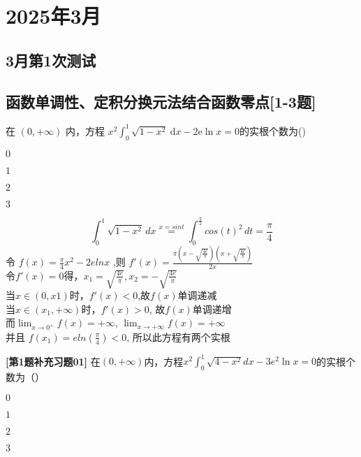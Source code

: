\chapter{2025年3月}
\section{3月第1次测试}
\section*{函数单调性、定积分换元法结合函数零点[1-3题]}
\begin{question}
    在  $(0,+\infty)$  内，方程  $x^{2} \int_{0}^{1} \sqrt{1-x^{2}} \mathrm{~d} x-2 \mathrm{e} \ln x=0$的实根个数为(\qquad)
  
    \begin{choices}
      \item $0$
      \item $1$
      \item $2$
      \item $3$
    \end{choices}
  \end{question}
\begin{solution}
    \[\int_{0}^{1} \sqrt{1-x^2} \,dx \stackrel{x = sint}{=} \int_{0}^{\frac{\pi}{2}} {cos(t)}^2 \,dt = \frac{\pi}{4}\]
    令 \( f(x) = \frac{\pi}{4}x^2 - 2e lnx \) ,则 \( f\prime(x) = \frac{ \pi(x - \sqrt{\frac{4e}{\pi}})(x + \sqrt{\frac{4e}{\pi}})}{2x} \)\\
    令\(f\prime(x) = 0\)得，\(x_1 = \sqrt{\frac{4e}{\pi}}, x_2 = -\sqrt{\frac{4e}{\pi}}\)\\
    当\(x \in (0,x1)\)时，\(f\prime(x) < 0\),故\(f(x)\)单调递减\\
    当\(x \in (x_1,+\infty)\)时，\(f\prime(x) > 0\), 故\(f(x)\)单调递增\\
    而\(\lim_{x \to 0^+} f(x) = +\infty\), \(\lim_{x \to +\infty} f(x) = +\infty\)\\
    并且 \(f(x_1) = e ln(\frac{\pi}{4}) < 0\), 所以此方程有两个实根
\end{solution}
\begin{question}
    \textbf{[第1题补充习题01]}
    在\((0,+\infty)\)内，方程\(x^{2}\int_{0}^{1}\sqrt{4 - x^{2}}dx - 3e^{2}\ln x = 0\)的实根个数为（\qquad ）
    \begin{choices}
        \item \(0\)
        \item \(1\)
        \item \(2\)
        \item \(3\)
    \end{choices}
\end{question}
